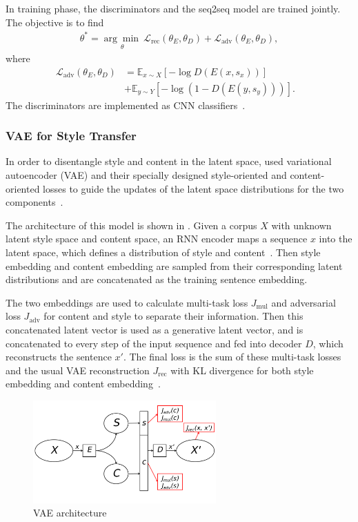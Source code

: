 In training phase, the discriminators and the seq2seq model are trained jointly. The objective is to find
\begin{align*}
\theta^* = \underset{\theta}{\arg\min\ } \mathcal{L}_{\mathrm{rec}} (\theta_E, \theta_D) + \mathcal{L} _{\mathrm{adv}}(\theta_E, \theta_D),
\end{align*}
where
\begin{align*}
\mathcal{L}_{\mathrm{adv}}(\theta_E, \theta_D) & = \mathbb{E}_{x\sim X}[-\log D(E(x, s_x))] & \\
& + \mathbb{E}_{y\sim Y}[-\log (1 - D(E(y, s_y)))].
\end{align*}
The discriminators are implemented as CNN classifiers~\cite{kim2014convolutional}.


\subsubsection*{VAE for Style Transfer}

In order to disentangle style and content in the latent space, \citet{john2018disentangled} used variational autoencoder (VAE) and their specially designed style-oriented and content-oriented losses to guide the updates of the latent space distributions for the two components~\cite{kingma2013auto}. 

The architecture of this model is shown in . Given a corpus $X$ with unknown latent style space and content space, 
an RNN encoder maps a sequence $x$ into the latent space, 
which defines a distribution of style and content~\cite{cho2014learning}. 
Then style embedding and content embedding are sampled from 
their corresponding latent distributions and are concatenated 
as the training sentence embedding. 

The two embeddings are used to calculate multi-task 
loss $J_{\mathrm{mul}}$ and adversarial loss $J_{\mathrm{adv}}$ 
for content and style to separate their information. 
Then this concatenated latent vector is used as a generative 
latent vector, and is concatenated to every step of the input sequence
and fed into decoder $D$, which reconstructs the sentence $x'$. 
The final loss is the sum of these multi-task losses and the usual VAE reconstruction $J_{\mathrm{rec}}$ with 
KL divergence for both style embedding and content 
embedding~\cite{kingma2013auto}.

\begin{figure}[htbp]
	\centering
	\includegraphics[width=7cm]{./images/vae.pdf}
	\caption{VAE architecture}
	\label{fig:vae}
\end{figure}


